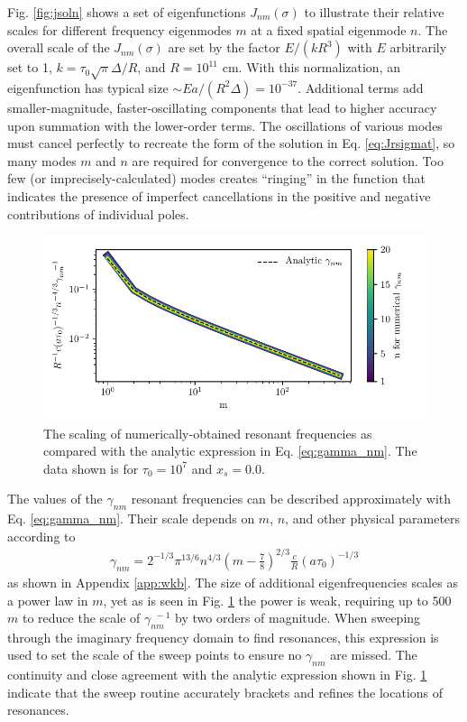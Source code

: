 \documentclass{aastex63}
\newcommand{\be}{\begin{eqnarray}}
\newcommand{\ee}{\end{eqnarray}}
\begin{document}
Fig. \ref{fig:jsoln} shows a set of eigenfunctions $J_{nm}(\sigma)$ to illustrate their relative scales for different frequency eigenmodes $m$ at a fixed spatial eigenmode $n$. The overall scale of the $J_{nm}(\sigma)$ are set by the factor $E/(kR^3)$ with $E$ arbitrarily set to 1, $k = \tau_0 \sqrt{\pi} \Delta / R$, and $R = 10^{11}$ cm. With this normalization, an eigenfunction has typical size ${\sim} E a / \left(R^2 \Delta \right) = 10^{-37}$. Additional terms add smaller-magnitude, faster-oscillating components that lead to higher accuracy upon summation with the lower-order terms. The oscillations of various modes must cancel perfectly to recreate the form of the solution in Eq. \ref{eq:Jrsigmat}, so many modes $m$ and $n$ are required for convergence to the correct solution. Too few (or imprecisely-calculated) modes creates ``ringing'' in the function that indicates the presence of imperfect cancellations in the positive and negative contributions of individual poles. 
\begin{figure}
    \centering
    \includegraphics[width=\textwidth]{gamma_nm.pdf}
    \caption{The scaling of numerically-obtained resonant frequencies as compared with the analytic expression in Eq. \ref{eq:gamma_nm}. The data shown is for $\tau_0=10^7$ and $x_s=0.0$.}
    \label{fig:gamma_nm}
\end{figure}
The values of the $\gamma_{nm}$ resonant frequencies can be described approximately with Eq. \ref{eq:gamma_nm}. Their scale depends on $m$, $n$, and other physical parameters according to 
\be \label{eq:gamma_nm}
\gamma_{nm} = 2^{-1/3} \pi^{13/6} n^{4/3}\left(m-\frac{7}{8}\right)^{2/3}\frac{c}{R}(a\tau_0)^{-1/3}
\ee
as shown in Appendix \ref{app:wkb}. The size of additional eigenfrequencies scales as a power law in $m$, yet as is seen in Fig. \ref{fig:gamma_nm} the power is weak, requiring up to 500 $m$ to reduce the scale of $\gamma_{nm}^{\ \ -1}$ by two orders of magnitude. When sweeping through the imaginary frequency domain to find resonances, this expression is used to set the scale of the sweep points to ensure no $\gamma_{nm}$ are missed. The continuity and close agreement with the analytic expression shown in Fig. \ref{fig:gamma_nm} indicate that the sweep routine accurately brackets and refines the locations of resonances.
\end{document}

